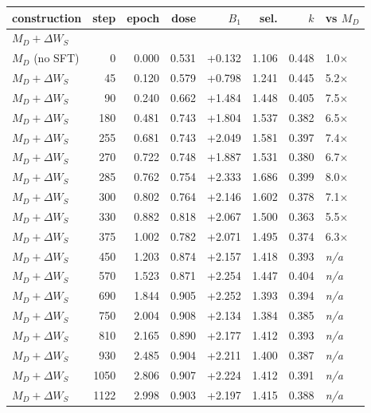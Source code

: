 \begin{table}[t]
\centering
\footnotesize
\setlength{\tabcolsep}{4pt}
\begin{tabular}{lrrrrrrl}
\toprule
construction & step & epoch & dose & $B_1$ & sel. & $k$ & vs $M_D$ \\
\midrule
\multicolumn{8}{l}{\emph{$M_D{+}\Delta W_S$}} \\
$M_D$ (no SFT) & 0 & 0.000 & 0.531 & +0.132 & 1.106 & 0.448 & 1.0$\times$ \\
$M_D{+}\Delta W_S$ & 45 & 0.120 & 0.579 & +0.798 & 1.241 & 0.445 & 5.2$\times$ \\
$M_D{+}\Delta W_S$ & 90 & 0.240 & 0.662 & +1.484 & 1.448 & 0.405 & 7.5$\times$ \\
$M_D{+}\Delta W_S$ & 180 & 0.481 & 0.743 & +1.804 & 1.537 & 0.382 & 6.5$\times$ \\
$M_D{+}\Delta W_S$ & 255 & 0.681 & 0.743 & +2.049 & 1.581 & 0.397 & 7.4$\times$ \\
$M_D{+}\Delta W_S$ & 270 & 0.722 & 0.748 & +1.887 & 1.531 & 0.380 & 6.7$\times$ \\
$M_D{+}\Delta W_S$ & 285 & 0.762 & 0.754 & +2.333 & 1.686 & 0.399 & 8.0$\times$ \\
$M_D{+}\Delta W_S$ & 300 & 0.802 & 0.764 & +2.146 & 1.602 & 0.378 & 7.1$\times$ \\
$M_D{+}\Delta W_S$ & 330 & 0.882 & 0.818 & +2.067 & 1.500 & 0.363 & 5.5$\times$ \\
$M_D{+}\Delta W_S$ & 375 & 1.002 & 0.782 & +2.071 & 1.495 & 0.374 & 6.3$\times$ \\
$M_D{+}\Delta W_S$ & 450 & 1.203 & 0.874 & +2.157 & 1.418 & 0.393 & \textit{n/a} \\
$M_D{+}\Delta W_S$ & 570 & 1.523 & 0.871 & +2.254 & 1.447 & 0.404 & \textit{n/a} \\
$M_D{+}\Delta W_S$ & 690 & 1.844 & 0.905 & +2.252 & 1.393 & 0.394 & \textit{n/a} \\
$M_D{+}\Delta W_S$ & 750 & 2.004 & 0.908 & +2.134 & 1.384 & 0.385 & \textit{n/a} \\
$M_D{+}\Delta W_S$ & 810 & 2.165 & 0.890 & +2.177 & 1.412 & 0.393 & \textit{n/a} \\
$M_D{+}\Delta W_S$ & 930 & 2.485 & 0.904 & +2.211 & 1.400 & 0.387 & \textit{n/a} \\
$M_D{+}\Delta W_S$ & 1050 & 2.806 & 0.907 & +2.224 & 1.412 & 0.391 & \textit{n/a} \\
$M_D{+}\Delta W_S$ & 1122 & 2.998 & 0.903 & +2.197 & 1.415 & 0.388 & \textit{n/a} \\

\end{tabular}
\end{table}
